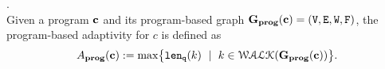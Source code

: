 \documentclass[a4paper,11pt]{article}
\begin{document}
\begin{defn}
.
\label{def:prog_adapt}
\\
{
Given a program ${\boldsymbol{\mathbf{c}}}$ and its program-based graph 
$\mathtt{\bf{G_{prog}}}({\boldsymbol{\mathbf{c}}}) = (\mathtt{V}, \mathtt{E}, \mathtt{W}, \mathtt{F})$,
%
the program-based adaptivity for $c$ is defined as%
\[
\progA(\ssa{c}) 
:= \max
\left\{ \qlen(k)\ \mid \  k\in \walks(\progG(\ssa{c}))\right \}.
\]
}
%
\end{defn}  
%
%
%
\end{document}
